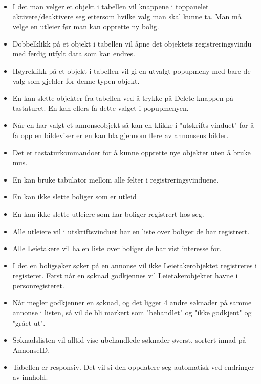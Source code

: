 \begin{itemize}[noitemsep,nolistsep]
\item I det man velger et objekt i tabellen vil knappene i toppanelet aktivere/deaktivere seg ettersom hvilke valg man skal kunne ta. Man må velge en utleier før man kan opprette ny bolig. \\
\item Dobbelklikk på et objekt i tabellen vil åpne det objektets registreringsvindu med ferdig utfylt data som kan endres. \\
\item Høyreklikk på et objekt i tabellen vil gi en utvalgt popupmeny med bare de valg som gjelder for denne typen objekt. \\
\item En kan slette objekter fra tabellen ved å trykke på Delete-knappen på tastaturet. En kan ellers få dette valget i popupmenyen. \\
\item Når en har valgt et annonseobjekt så kan en klikke i "utskrifts-vinduet" for å få opp en bildeviser er en kan bla gjennom flere av annonsens bilder. \\
\item Det er tastaturkommandoer for å kunne opprette nye objekter uten å bruke mus. \\
\item En kan bruke tabulator mellom alle felter i registreringsvinduene. \\
\item En kan ikke slette boliger som er utleid \\
\item En kan ikke slette utleiere som har boliger registrert hos seg. \\
\item Alle utleiere vil i utskriftsvinduet har en liste over boliger de har registrert. \\
\item Alle Leietakere vil ha en liste over boliger de har vist interesse for. \\
\item I det en boligsøker søker på en annonse vil ikke Leietakerobjektet registreres i registeret. Først når en søknad godkjennes vil Leietakerobjekter havne i personregisteret. \\
\item Når megler godkjenner en søknad, og det ligger 4 andre søknader på samme annonse i listen, så vil de bli markert som "behandlet" og "ikke godkjent" og "grået ut". \\
\item Søknadslisten vil alltid vise ubehandlede søknader øverst, sortert innad på AnnonseID. \\
\item Tabellen er responsiv. Det vil si den oppdatere seg automatisk ved endringer av innhold. \\
\end{itemize}